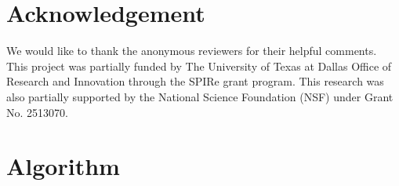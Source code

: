 \documentclass[10pt]{article} %
\begin{document}
\section{Acknowledgement}
We would like to thank the anonymous reviewers for their helpful comments. This project was partially funded by The University of Texas at Dallas Office of Research and Innovation through the SPIRe grant program. This research was also partially supported by the National Science Foundation (NSF) under Grant No. 2513070.






\clearpage


\appendix


\section{Algorithm}
\end{document}
